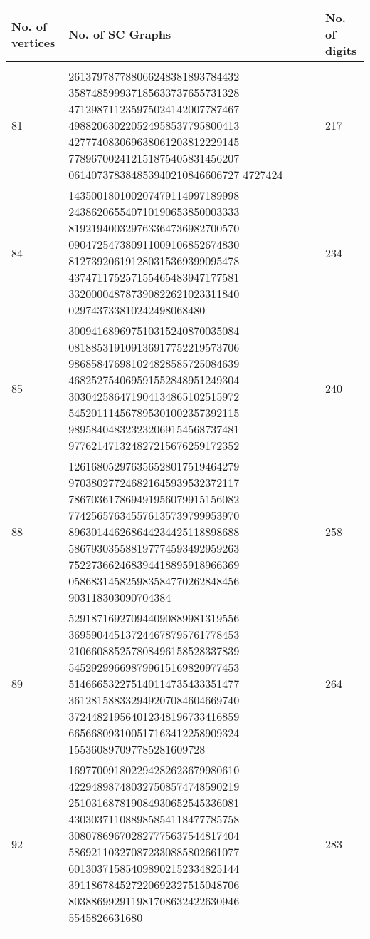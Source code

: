 \documentclass[12pt,conference]{IEEEtran}
\begin{document}
\begin{center}
\begin{tabular}{ |p{1.1cm} | p{5.3cm} | p{1.1cm}|}
  \hline
  No. of vertices& No. of SC Graphs & No. of digits \\ \hline
& & \\
81 & 261379787788066248381893784432 358748599937185633737655731328 471298711235975024142007787467 498820630220524958537795800413 427774083069638061203812229145 778967002412151875405831456207 061407378384853940210846606727 4727424 & 217 \\ \hline 
84 & 143500180100207479114997189998 243862065540710190653850003333 819219400329763364736982700570 090472547380911009106852674830 812739206191280315369399095478 437471175257155465483947177581 332000048787390822621023311840 029743733810242498068480 & 234 \\ \hline 
85 & 300941689697510315240870035084 081885319109136917752219573706 986858476981024828585725084639 468252754069591552848951249304 303042586471904134865102515972 545201114567895301002357392115 989584048323232069154568737481 977621471324827215676259172352  & 240 \\ \hline 
88 & 126168052976356528017519464279 970380277246821645939532372117 786703617869491956079915156082 774256576345576135739799953970 896301446268644234425118898688 586793035588197774593492959263 752273662468394418895918966369 058683145825983584770262848456 903118303090704384 & 258 \\ \hline 
89 & 529187169270944090889981319556 369590445137244678795761778453 210660885257808496158528337839 545292996698799615169820977453 514666532275140114735433351477 361281588332949207084604669740 372448219564012348196733416859 665668093100517163412258909324 155360897097785281609728 & 264 \\ \hline 
92 & 169770091802294282623679980610 422948987480327508574748590219 251031687819084930652545336081 430303711088985854118477785758 308078696702827775637544817404 586921103270872330885802661077 601303715854098902152334825144 391186784527220692327515048706 803886992911981708632422630946 5545826631680 & 283 \\

& & \\ \hline 

\end{tabular}


\end{center}
\end{document}
